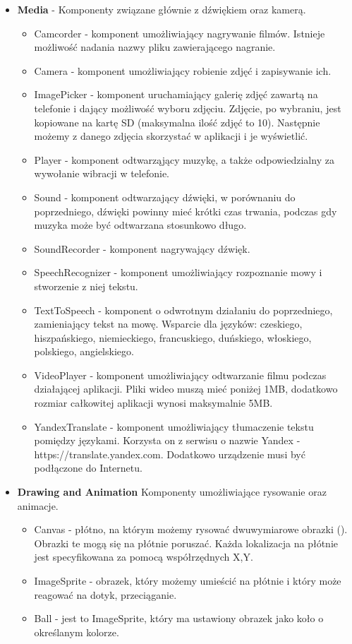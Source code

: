 \begin{itemize}
\item \textbf{Media} - Komponenty związane głównie z dźwiękiem oraz kamerą.
\begin{itemize}
\item Camcorder - komponent umożliwiający nagrywanie filmów. Istnieje możliwość nadania nazwy pliku zawierającego nagranie.
\item Camera - komponent umożliwiający robienie zdjęć i zapisywanie ich.
\item ImagePicker - komponent uruchamiający galerię zdjęć zawartą na telefonie i dający możliwość wyboru zdjęciu. Zdjęcie, po wybraniu, jest kopiowane na kartę SD (maksymalna ilość zdjęć to 10). Następnie możemy z danego zdjęcia skorzystać w aplikacji i je wyświetlić.
\item Player - komponent odtwarząjący muzykę, a także odpowiedzialny za wywołanie wibracji w telefonie.
\item Sound - komponent odtwarzający dźwięki, w porównaniu do poprzedniego, dźwięki powinny mieć krótki czas trwania, podczas gdy muzyka może być odtwarzana stosunkowo długo.
\item SoundRecorder - komponent nagrywający dźwięk.
\item SpeechRecognizer - komponent umożliwiający rozpoznanie mowy i stworzenie z niej tekstu.
\item TextToSpeech - komponent o odwrotnym działaniu do poprzedniego, zamieniający tekst na mowę. Wsparcie dla języków: czeskiego, hiszpańskiego, niemieckiego, francuskiego, duńskiego, włoskiego, polskiego, angielskiego.
\item VideoPlayer - komponent umożliwiający odtwarzanie filmu podczas działającej aplikacji. Pliki wideo muszą mieć poniżej 1MB, dodatkowo rozmiar całkowitej aplikacji wynosi maksymalnie 5MB.
\item YandexTranslate - komponent umożliwiający tłumaczenie tekstu pomiędzy językami. Korzysta on z serwisu o nazwie Yandex - https://translate.yandex.com. Dodatkowo urządzenie musi być podłączone do Internetu. 
\end{itemize}


\item \textbf{Drawing and Animation} Komponenty umożliwiające rysowanie oraz animacje.
\begin{itemize}
\item Canvas - płótno, na którym możemy rysować dwuwymiarowe obrazki (). Obrazki te mogą się na płótnie poruszać. Każda lokalizacja na płótnie jest specyfikowana za pomocą współrzędnych X,Y.
\item ImageSprite - obrazek, który możemy umieścić na płótnie i który może reagować na dotyk, przeciąganie.
\item Ball - jest to ImageSprite, który ma ustawiony obrazek jako koło o określanym kolorze.
\end{itemize}


\end{itemize}
